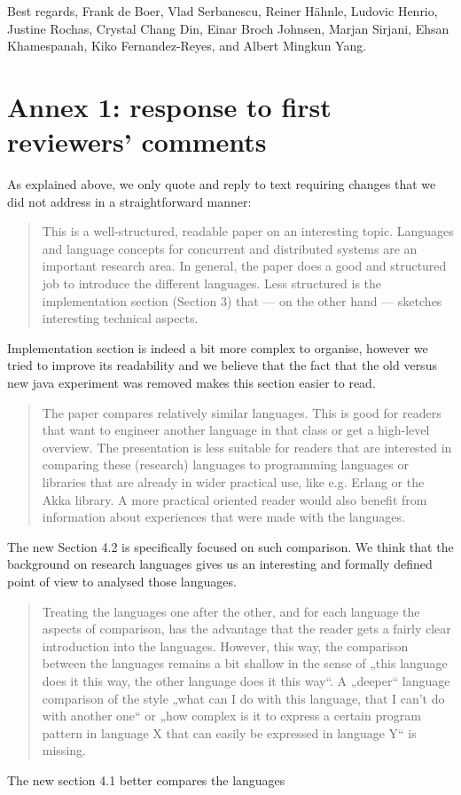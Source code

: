 \documentclass{article}
\begin{document}
\noindent
Best regards,
\newline
\noindent
Frank de Boer, Vlad Serbanescu,
	Reiner H\"ahnle,
	Ludovic Henrio, Justine Rochas,
	Crystal Chang Din, Einar Broch Johnsen,
	Marjan Sirjani,
	Ehsan Khamespanah,
	Kiko Fernandez-Reyes, and Albert Mingkun Yang.

\newpage
\section*{Annex 1: response to first reviewers' comments}
As explained above, we only quote and reply to text requiring changes that we did not 
address in a straightforward manner:

\begin{quote}
This is a well-structured, readable paper on an interesting topic. Languages and language 
concepts for concurrent and distributed systems are an important research area. In 
general, the paper does a good and structured job to introduce the different languages. 
Less structured is the implementation section (Section 3) that — on the other hand — 
sketches interesting technical aspects.
\end{quote}
Implementation section is indeed a bit more complex to organise, however we tried to 
improve its readability and we believe that the fact that the old versus new java 
experiment was removed makes this section easier to read.

\begin{quote}
The paper compares relatively similar languages. This is good for readers that want to 
engineer another language in that class or get a high-level overview. The presentation is 
less suitable for readers that are interested in comparing these (research) languages to 
programming languages or libraries that are already in wider practical use, like e.g. 
Erlang or the Akka library. A more practical oriented reader would also benefit from 
information about experiences that were made with the languages.
\end{quote}
The new Section 4.2 is specifically focused on such comparison. We think that the 
background on research languages gives us an interesting and formally defined point of 
view to analysed those languages.

\begin{quote}
Treating the languages one after the other, and for each language the aspects of 
comparison, has the advantage that the reader gets a fairly clear introduction into the 
languages. However, this way, the comparison between the languages remains a bit shallow 
in the sense of „this language does it this way, the other language does it this way“. A 
„deeper“ language comparison of the style „what can I do with this language, that I can’t 
do with another one“ or „how complex is it to express a certain program pattern in 
language X that can easily be expressed in language Y“ is missing. 
\end{quote}
The new section 4.1 better compares the languages
\end{document}
